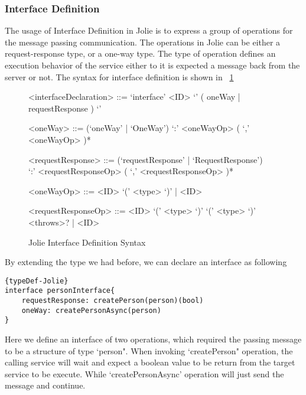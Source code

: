 \subsubsection{Interface Definition}

The usage of Interface Definition in Jolie is to express a group of operations for the message passing communication. The operations in Jolie can be either a request-response type, or a one-way type. The type of operation defines an execution behavior of the service either to it is expected a message back from the server or not. The syntax for interface definition is shown in ~\ref{fig:InterfaceDefinitonSyntax}

\begin{figure}[h]
	\begin{framed}
		\begin{grammar}
			<interfaceDeclaration> ::= `interface' <ID> `{' ( oneWay | requestResponse ) `}'

			<oneWay> ::= (`oneWay' | `OneWay')  `:' <oneWayOp> ( `,' <oneWayOp> )*

			<requestResponse> ::= (`requestResponse' | `RequestResponse') \\ `:' <requestResponseOp> ( `,' <requestResponseOp> )*

			<oneWayOp> ::= <ID> `(' <type> `)' | <ID>

			<requestResponseOp> ::= <ID> `(' <type> `)' `(' <type> `)' <throws>? | <ID>

		\end{grammar}
	\end{framed}
	\caption{Jolie Interface Definition Syntax\protect\footnotemark}
	\label{fig:InterfaceDefinitonSyntax}
\end{figure}


By extending the type we had before, we can declare an interface as following
\begin{listing}[h]

\lstset{language=Jolie,
	style=codeStyle
}
\begin{lstlisting}[frame=tlrb]{typeDef-Jolie}
interface personInterface{
	requestResponse: createPerson(person)(bool)
	oneWay: createPersonAsync(person)
}
\end{lstlisting}
\caption{Jolie Interface declaration example}

\end{listing}

Here we define an interface of two operations, which required the passing message to be a structure of type `person". When invoking `createPerson" operation, the calling service will wait and expect a boolean value to be return from the target service to be execute. While `createPersonAsync' operation will just send the message and continue.

\FloatBarrier
